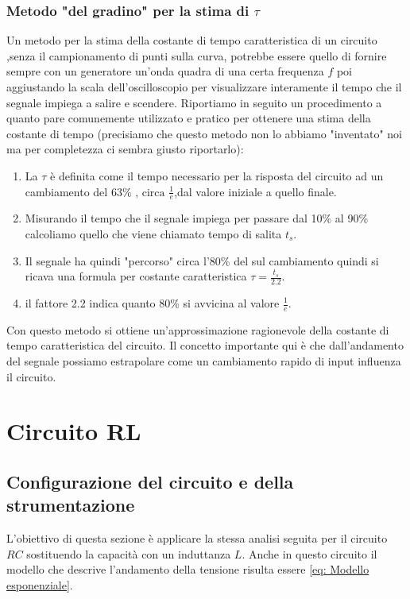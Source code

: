 \documentclass[letterpaper,12pt]{article}
\begin{document}
\subsubsection{Metodo "del gradino" per la stima  di $\tau$}
Un metodo per la stima della costante di tempo caratteristica di un circuito ,senza il campionamento di punti sulla curva, potrebbe essere quello di fornire sempre con un generatore un'onda quadra di una certa frequenza $f$ poi aggiustando la scala dell'oscilloscopio per visualizzare interamente il tempo che il segnale impiega a salire e scendere. Riportiamo in seguito un procedimento a quanto pare comunemente utilizzato e pratico per ottenere una stima della costante di tempo (precisiamo che questo metodo non lo abbiamo "inventato" noi ma per completezza ci sembra giusto riportarlo):
\begin{enumerate}
    \item La $\tau$ è definita come il tempo necessario per la risposta del circuito ad un cambiamento del $ 63\% \text{ , circa } \frac{1}{e} $,dal valore iniziale a quello finale.
    \item Misurando il tempo che il segnale impiega per passare dal 10\% al 90\% calcoliamo quello che viene chiamato tempo di salita $t_s$.
    \item Il segnale ha quindi "percorso" circa l'80\% del sul cambiamento quindi si ricava una formula per costante caratteristica $ \tau = \frac{t_s}{2.2}$.
    \item il fattore 2.2 indica quanto 80\% si avvicina al valore $\frac{1}{e}$.
\end{enumerate}
Con questo metodo si ottiene un'approssimazione ragionevole della costante di tempo caratteristica del circuito. Il concetto importante qui è che dall'andamento del segnale possiamo estrapolare come un cambiamento rapido di input influenza il circuito.

\section{Circuito RL}

\subsection{Configurazione del circuito e della strumentazione}
L'obiettivo di questa sezione è applicare la stessa analisi seguita per il circuito $RC$ sostituendo la capacità con un induttanza $L$.
Anche in questo circuito il modello che descrive l'andamento della tensione risulta essere \eqref{eq: Modello esponenziale}.
\end{document}
